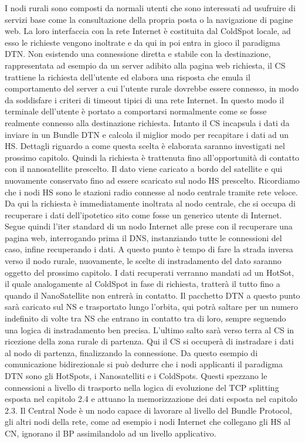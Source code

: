 \documentclass[12pt,a4paper,oneside]{book}
\begin{document}
		I nodi rurali sono composti da normali utenti che sono interessati ad usufruire di servizi base come la consultazione della propria posta o la navigazione di pagine web. La loro interfaccia con la rete Internet è costituita dal ColdSpot locale, ad esso le richieste vengono inoltrate e da qui in poi entra in gioco il paradigma DTN. Non esistendo una connessione diretta e stabile con la destinazione, rappresentata ad esempio da un server adibito alla pagina web richiesta, il CS trattiene la richiesta dell'utente ed elabora una risposta che emula il comportamento del server a cui l'utente rurale dovrebbe essere connesso, in modo da soddisfare i criteri di timeout tipici di una rete Internet. In questo modo il terminale dell'utente è portato a comportarsi normalmente come se fosse realmente connesso alla destinazione richiesta. Intanto il CS incapsula i dati da inviare in un Bundle DTN e calcola il miglior modo per recapitare i dati ad un HS. Dettagli riguardo a come questa scelta è elaborata saranno investigati nel prossimo capitolo. Quindi la richiesta è trattenuta fino all'opportunità di contatto con il nanosatellite prescelto. Il dato viene caricato a bordo del satellite e qui nuovamente conservato fino ad essere scaricato sul nodo HS prescelto. Ricordiamo che i nodi HS sono le stazioni radio connesse al nodo centrale tramite rete veloce. Da qui la richiesta è immediatamente inoltrata al nodo centrale, che si occupa di recuperare i dati dell'ipotetico sito come fosse un generico utente di Internet. Segue quindi l'iter standard di un nodo Internet alle prese con il recuperare una pagina web, interrogando prima il DNS, instanziando tutte le connessioni del caso, infine recuperando i dati. A questo punto è tempo di fare la strada inversa verso il nodo rurale, nuovamente, le scelte di instradamento del dato saranno oggetto del prossimo capitolo. I dati recuperati verranno mandati ad un HotSot, il quale analogamente al ColdSpot in fase di richiesta, tratterà il tutto fino a quando il NanoSatellite non entrerà in contatto. Il pacchetto DTN a questo punto sarà caricato sul NS e trasportato lungo l'orbita, qui potrà saltare per un numero indefinito di volte tra NS che entrano in contatto tra di loro, sempre seguendo una logica di instradamento ben precisa. L'ultimo salto sarà verso terra al CS in ricezione della zona rurale di partenza. Qui il CS si occuperà di instradare i dati al nodo di partenza, finalizzando la connessione.
		Da questo esempio di comunicazione bidirezionale si può dedurre che i nodi applicanti il paradigma DTN sono gli HotSpots, i Nanosatelliti e i ColdSpots. Questi spezzano le connessioni a livello di trasporto nella logica di evoluzione del TCP splitting esposta nel capitolo 2.4 e attuano la memorizzazione dei dati esposta nel capitolo 2.3. Il Central Node è un nodo capace di lavorare al livello del Bundle Protocol, gli altri nodi della rete, come ad esempio i nodi Internet che collegano gli HS al CN, ignorano il BP assimilandolo ad un livello applicativo. 
	
\end{document}
